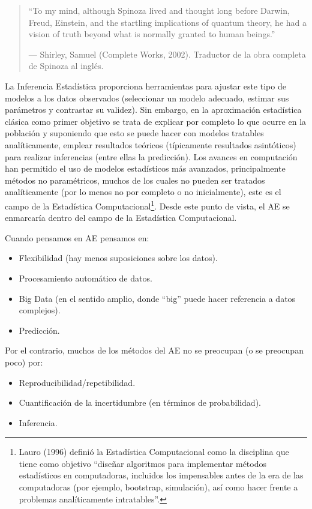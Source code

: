 \documentclass[
]{book}
\theoremstyle{break}
\theoremstyle{definition}
\theoremstyle{definition}
\theoremstyle{definition}
\theoremstyle{definition}
\theoremstyle{remark}
\begin{document}
\begin{quote}
``To my mind, although Spinoza lived and thought long before Darwin, Freud, Einstein, and the startling implications of quantum theory, he had a vision of truth beyond what is normally granted to human beings.''

--- Shirley, Samuel (Complete Works, 2002). Traductor de la obra completa de Spinoza al inglés.
\end{quote}

La Inferencia Estadística proporciona herramientas para ajustar este tipo de modelos a los datos observados (seleccionar un modelo adecuado, estimar sus parámetros y contrastar su validez).
Sin embargo, en la aproximación estadística clásica como primer objetivo se trata de explicar por completo lo que ocurre en la población y suponiendo que esto se puede hacer con modelos tratables analíticamente, emplear resultados teóricos (típicamente resultados asintóticos) para realizar inferencias (entre ellas la predicción).
Los avances en computación han permitido el uso de modelos estadísticos más avanzados, principalmente métodos no paramétricos, muchos de los cuales no pueden ser tratados analíticamente (por lo menos no por completo o no inicialmente), este es el campo de la Estadística Computacional\footnote{Lauro (1996) definió la Estadística Computacional como la disciplina que tiene como objetivo ``diseñar algoritmos para implementar métodos estadísticos en computadoras, incluidos los impensables antes de la era de las computadoras (por ejemplo, bootstrap, simulación), así como hacer frente a problemas analíticamente intratables''.}. Desde este punto de vista, el AE se enmarcaría dentro del campo de la Estadística Computacional.

Cuando pensamos en AE pensamos en:

\begin{itemize}
\item
  Flexibilidad (hay menos suposiciones sobre los datos).
\item
  Procesamiento automático de datos.
\item
  Big Data (en el sentido amplio, donde ``big'' puede hacer referencia a datos complejos).
\item
  Predicción.
\end{itemize}

Por el contrario, muchos de los métodos del AE no se preocupan (o se preocupan poco) por:

\begin{itemize}
\item
  Reproducibilidad/repetibilidad.
\item
  Cuantificación de la incertidumbre (en términos de probabilidad).
\item
  Inferencia.
\end{itemize}
\end{document}
